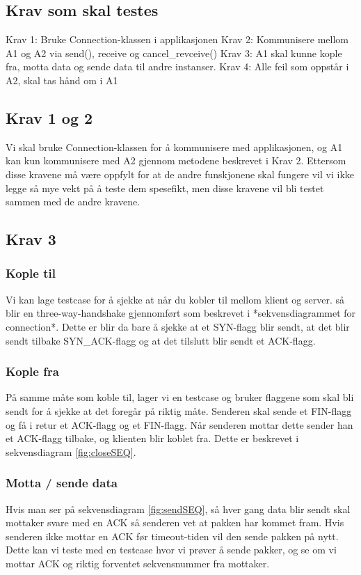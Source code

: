 \subsection{Krav som skal testes}
Krav 1: Bruke Connection-klassen i applikasjonen
Krav 2: Kommunisere mellom A1 og A2 via send(), receive og cancel\_revceive()
Krav 3: A1 skal kunne kople fra, motta data og sende data til andre instanser.
Krav 4: Alle feil som oppstår i A2, skal tas hånd om i A1

\subsection{Krav 1 og 2}
Vi skal bruke Connection-klassen for å kommunisere med applikasjonen, og A1 kan kun kommunisere med A2 gjennom metodene beskrevet i Krav 2. 
Ettersom disse kravene må være oppfylt for at de andre funskjonene skal fungere vil vi ikke legge så mye vekt på å teste dem spesefikt, men disse kravene vil bli testet sammen med de andre kravene.

\subsection{Krav 3}
\subsubsection{Kople til}
Vi kan lage testcase for å sjekke at når du kobler til mellom klient og server. så blir en three-way-handshake gjennomført som beskrevet i *sekvensdiagrammet for connection*. Dette er blir da bare å sjekke at et SYN-flagg blir sendt, at det blir sendt tilbake SYN\_ACK-flagg og at det tilslutt blir sendt et ACK-flagg.

\subsubsection{Kople fra}
På samme måte som koble til, lager vi en testcase og bruker flaggene som skal bli sendt for å sjekke at det foregår på riktig måte. Senderen skal sende et FIN-flagg og få i retur et ACK-flagg og et FIN-flagg. Når senderen mottar dette sender han et ACK-flagg tilbake, og klienten blir koblet fra. Dette er beskrevet i sekvensdiagram \ref{fig:closeSEQ}.

\subsubsection{Motta / sende data}
Hvis man ser på sekvensdiagram \ref{fig:sendSEQ}, så hver gang data blir sendt skal mottaker svare med en ACK så senderen vet at pakken har kommet fram. Hvis senderen ikke mottar en ACK før timeout-tiden vil den sende pakken på nytt. Dette kan vi teste med en testcase hvor vi prøver å sende pakker, og se om vi mottar ACK og riktig forventet sekvensnummer fra mottaker.


